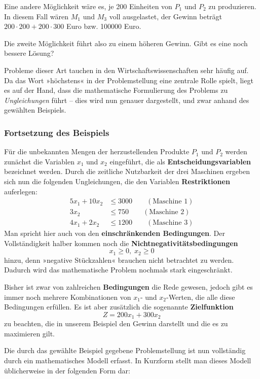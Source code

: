 Eine andere Möglichkeit wäre es, je 200 Einheiten von $P_1$ und $P_2$ zu produzieren. In diesem Fall wären $M_1$ und $M_3$ voll ausgelastet, der Gewinn beträgt $200 \cdot 200 + 200 \cdot 300$ Euro bzw. 100000 Euro.

Die zweite Möglichkeit führt also zu einem höheren Gewinn. Gibt es eine noch bessere Lösung?

Probleme dieser Art tauchen in den Wirtschaftswissenschaften sehr häufig auf. Da das Wort »höchstens« in der Problemstellung eine zentrale Rolle spielt, liegt es auf der Hand, dass die mathematische Formulierung des Problems zu \emph{Ungleichungen} führt -- dies wird nun genauer dargestellt, und zwar anhand des gewählten Beispiels.

\subsubsection{Fortsetzung des Beispiels}

Für die unbekannten Mengen der herzustellenden Produkte $P_1$ und $P_2$ werden zunächst die Variablen $x_1$ und $x_2$ eingeführt, die als \textbf{Entscheidungsvariablen} bezeichnet werden. Durch die zeitliche Nutzbarkeit der drei Maschinen ergeben sich nun die folgenden Ungleichungen, die den Variablen \textbf{Restriktionen} auferlegen:
\begin{align*}
  5x_1 + 10x_2 &\leq 3000 \qquad (\text{Maschine 1})\\
  3x_2 &\leq 750 \qquad (\text{Maschine 2})\\
  4x_1 + 2x_2 &\leq 1200 \qquad (\text{Maschine 3})
\end{align*}
Man spricht hier auch von den \textbf{einschränkenden Bedingungen}. Der Vollständigkeit halber kommen noch die \textbf{Nichtnegativitätsbedingungen}
\[ x_1 \geq 0, \; x_2 \geq 0 \]
hinzu, denn »negative Stückzahlen« brauchen nicht betrachtet zu werden. Dadurch wird das mathematische Problem nochmals stark eingeschränkt.

Bisher ist zwar von zahlreichen \textbf{Bedingungen} die Rede gewesen, jedoch gibt es immer noch mehrere Kombinationen von $x_1$- und $x_2$-Werten, die alle diese Bedingungen erfüllen. Es ist aber zusätzlich die sogenannte \textbf{Zielfunktion}
\[ Z = 200 x_1 + 300 x_2 \]
zu beachten, die in unserem Beispiel den Gewinn darstellt und die es zu maximieren gilt.

Die durch das gewählte Beispiel gegebene Problemstellung ist nun vollständig durch ein mathematisches Modell erfasst. In Kurzform stellt man dieses Modell üblicherweise in der folgenden Form dar:
\begin{center}
\end{center}

